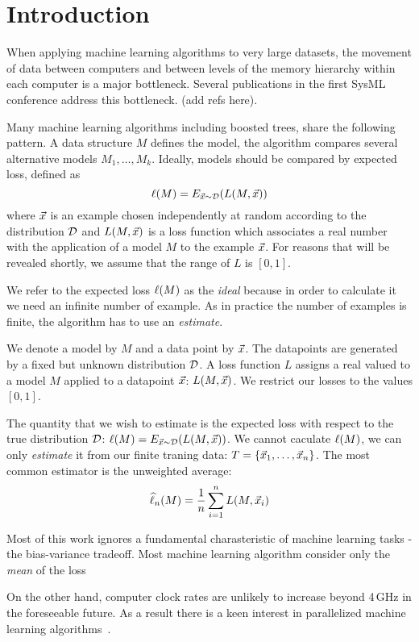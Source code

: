 \section{Introduction}\label{sec:intro}

When applying machine learning algorithms to very large datasets, the
movement of data between computers and between levels of the memory
hierarchy within each computer is a major bottleneck. Several
publications in the first SysML conference address this
bottleneck. (add refs here).

Many machine learning algorithms including boosted trees, share the
following pattern. A data structure $M$ defines the model, the
algorithm compares several alternative models $M_1,\ldots,M_k$. Ideally,
models should be compared by expected loss, defined as 
$$\ell(M) = E_{\vec{x} \sim {\cal D}}(L(M,\vec{x}))$$
where $\vec{x}$ is an example chosen independently at random according to
the distribution ${\cal D}$ and $L(M,\vec{x})$ is a loss function which associates a
real number with the application of a model $M$ to the example $\vec{x}$.
For reasons that will be revealed shortly, we assume that the range of
$L$ is $[0,1]$.

We refer to the expected loss $\ell(M)$ as the {\em ideal} because in
order to calculate it we need an infinite number of example. As in
practice the number of examples is finite, the algorithm has to use an {\em estimate}.

We denote a model by $M$ and a data point by $\vec{x}$. The datapoints are
generated by a fixed but unknown distribution ${\cal D}$. A loss function $L$
assigns a real valued to a model $M$ applied to a datapoint $\vec{x}$:
$L(M,\vec{x})$. We restrict our losses to the values $[0,1]$.

The quantity that we wish to estimate is the expected loss with
respect to the true distribution ${\cal D}$: $\ell(M) = E_{\vec{x} \sim
  {\cal D}}(L(M,\vec{x}))$. We cannot caculate $\ell(M)$, we can only
{\em estimate} it from our finite traning data: $T = \{ \vec{x}_1, \ldots,
\vec{x}_n\}$. The most common estimator is the unweighted average:
$$ \widehat{\ell}_n(M) = \frac{1}{n} \sum_{i=1}^n L(M,\vec{x}_i)$$




Most of this work ignores a fundamental charasteristic
of machine learning tasks - the bias-variance tradeoff. Most machine
learning algorithm consider only the {\em mean} of the loss

On the other hand, computer clock rates are unlikely to increase
beyond 4\,GHz in the foreseeable future.  As a result there is a keen
interest in parallelized machine
learning algorithms~\cite{bekkerman_scaling_2012}.

